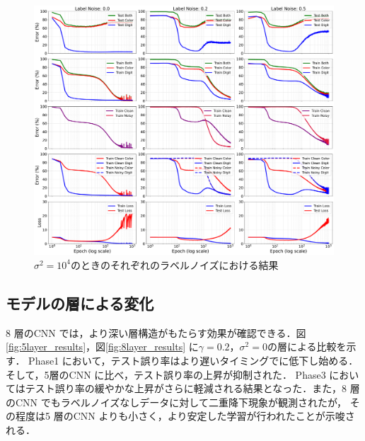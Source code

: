 \begin{figure}[H]
    \centering
    \includegraphics[width=\linewidth]{fig/erroe_metrics_by_variances/error_metrics_by_label_noise_variance_10000.pdf}
    \caption{$\sigma^2 = 10^4$のときのそれぞれのラベルノイズにおける結果}
    \label{fig:errors_by_label_noise_variance_10000}
\end{figure}

\newpage

\subsection{モデルの層による変化}
8 層のCNN では，より深い層構造がもたらす効果が確認できる．図\ref{fig:5layer_results}，図\ref{fig:8layer_results}
に$\gamma = 0.2，\sigma^2 = 0$の層による比較を示す．
Phase1 において，テスト誤り率はより遅いタイミングでに低下し始める．そして，5層のCNN に比べ，テスト誤り率の上昇が抑制された．
Phase3 においてはテスト誤り率の緩やかな上昇がさらに軽減される結果となった．また，8 層のCNN でもラベルノイズなしデータに対して二重降下現象が観測されたが，
その程度は5 層のCNN よりも小さく，より安定した学習が行われたことが示唆される．

